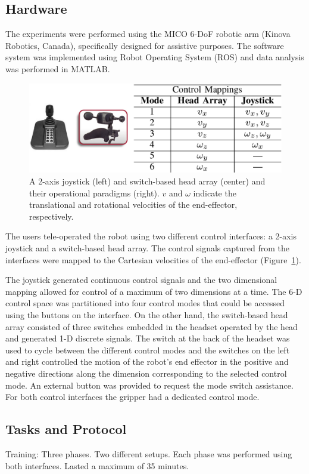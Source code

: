 \subsection{Hardware}\label{ssec:hardware}
The experiments were performed using the MICO 6-DoF robotic arm (Kinova Robotics, Canada), specifically designed for assistive purposes. The software system was implemented using Robot Operating System (ROS) and data analysis was performed in MATLAB. 
\begin{figure}[h]
	\centering
	\includegraphics[width = 1\hsize, height = 0.14\vsize]{./figures/INTER_4.eps}
	\caption{A 2-axis joystick (left) and switch-based head array (center) and their operational paradigms (right). $v$ and $\omega$ indicate the translational and rotational velocities of the end-effector, respectively.}
	\label{fig:interfaces}
\end{figure}
The users tele-operated the robot using two different control interfaces: a 2-axis joystick and a switch-based head array. The control signals captured from the interfaces were mapped to the Cartesian velocities of the end-effector (Figure~\ref{fig:interfaces}).

The joystick generated continuous control signals and the two dimensional mapping allowed for control of a maximum of two dimensions at a time. The 6-D control space was partitioned into four control modes that could be accessed using the buttons on the interface. On the other hand, the switch-based head array consisted of three switches embedded in the headset operated by the head and generated 1-D discrete signals. The switch at the back of the headset was used to cycle between the different control modes and the switches on the left and right controlled the motion of the robot's end effector in the positive and negative directions along the dimension corresponding to the selected control mode. An external button was provided to request the mode switch assistance. For both control interfaces the gripper had a dedicated control mode. 
\subsection{Tasks and Protocol}
Training: Three phases. Two different setups. Each phase was performed using both interfaces. Lasted a maximum of 35 minutes.	

